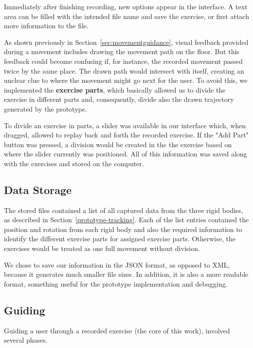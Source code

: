 Immediately after finishing recording, new options appear in the interface. 
A text area can be filled with the intended file name and save the exercise, or first attach more information to the file.

As shown previously in Section~\ref{sec:movementguidance}, visual feedback provided during a movement includes drawing the movement path on the floor. 
But this feedback could become confusing if, for instance, the recorded movement passed twice by the same place. 
The drawn path would intersect with itself, creating an unclear clue to where the movement might go next for the user. 
To avoid this, we implemented the \textbf{exercise parts}, which basically allowed us to divide the exercise in different parts and, consequently, divide also the drawn trajectory generated by the prototype.

To divide an exercise in parts, a slider was available in our interface which, when dragged, allowed to replay back and forth the recorded exercise. 
If the "Add Part" button was pressed, a division would be created in the the exercise based on where the slider currently was positioned.
All of this information was saved along with the exercises and stored on the computer.



\subsection{Data Storage}

The stored files contained a list of all captured data from the three rigid bodies, as described in Section~\ref{prototype-tracking}. 
Each of the list entries contained the position and rotation from each rigid body and also the required information to identify the different exercise parts for assigned exercise parts. Otherwise, the exercises would be treated as one full movement without division.

We chose to save our information in the JSON format, as opposed to XML, because it generates much smaller file sizes. In addition, it is also a more readable format, something useful for the prototype implementation and debugging.

\subsection{Guiding}

Guiding a user through a recorded exercise (the core of this work), involved several phases.

